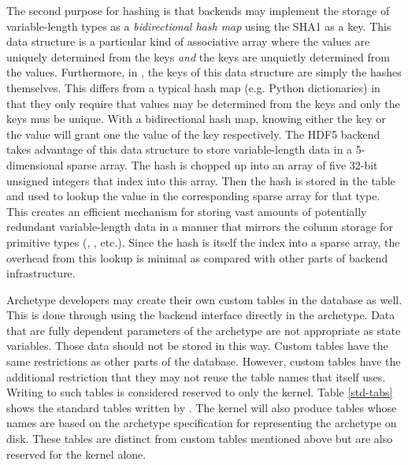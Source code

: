 The second purpose for hashing is that backends may implement the storage 
of variable-length types as a \emph{bidirectional hash map} using the 
\gls{SHA1} as a key.  This data structure is a particular kind of associative array where the values are 
uniquely determined from the keys \emph{and} the keys are unquietly determined from 
the values. Furthermore, in \cyclus, the keys of this data structure are simply the 
hashes themselves. This differs from a typical hash map (e.g. Python dictionaries) 
in that they only require that values may be determined from the keys and only the
keys mus be unique.  With a bidirectional hash map, knowing either the key or the value
will grant one the value of the key respectively.  The \gls{HDF5} backend takes advantage 
of this data structure to store variable-length data in a 5-dimensional sparse array.
The hash is chopped up into an array of five 32-bit unsigned integers that 
index into this array. Then the hash is stored in the table and used to lookup 
the value in the corresponding sparse array for that type.  This creates an efficient 
mechanism for storing vast amounts of potentially redundant variable-length data in 
a manner that mirrors the column storage for primitive types (, , 
etc.). Since the hash is itself the index into a sparse array, the overhead from 
this lookup is minimal as compared with other parts of backend infrastructure.

Archetype developers may create their own custom tables in the database as well.
This is done through using the backend interface directly in the archetype. 
Data that are fully dependent parameters of the archetype are not appropriate 
as state variables. Those data should not be stored in this way.  Custom tables 
have the same restrictions as other parts of the database.  However, custom tables
have the additional restriction that they may not reuse the table names that 
\cyclus itself uses. Writing to such tables is considered reserved to only
the kernel. 
Table \ref{std-tabs} shows the standard tables written by \cyclus.
The kernel will also produce tables whose names are based on the 
archetype specification for representing the archetype on disk.  These tables
are distinct from custom tables mentioned above but are also reserved for the 
kernel alone. 


